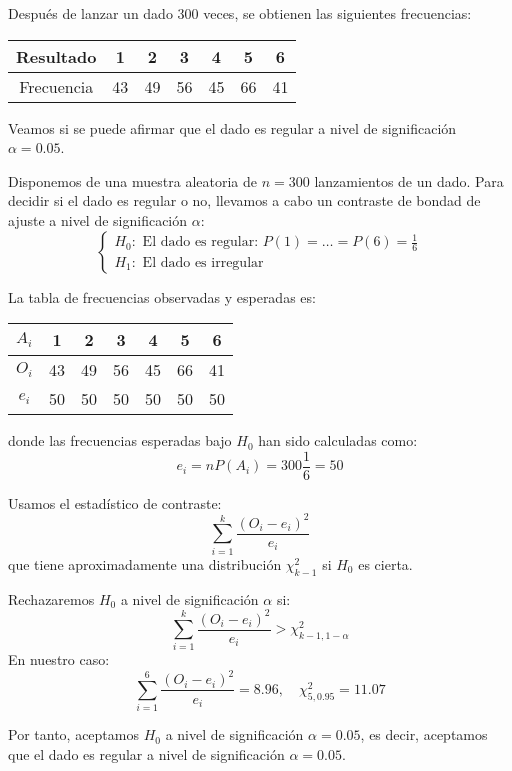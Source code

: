 \begin{example}
    Después de lanzar un dado 300 veces, se obtienen las siguientes frecuencias:
    \begin{center}
        \begin{tabular}{ | c | c c c c c c | }
            \hline
            Resultado  & 1  & 2  & 3  & 4  & 5  & 6  \\
            \hline
            Frecuencia & 43 & 49 & 56 & 45 & 66 & 41 \\
            \hline
        \end{tabular}
    \end{center}

    Veamos si se puede afirmar que el dado es regular a nivel de significación $\alpha = 0.05$.

    Disponemos de una muestra aleatoria de $n = 300$ lanzamientos de un dado.
    Para decidir si el dado es regular o no, llevamos a cabo un contraste de bondad de ajuste a nivel de significación $\alpha$:
    $$\begin{cases}
            H_0: \text{ El dado es regular: } P(1) = \dots = P(6) = \frac{1}{6} \\
            H_1: \text{ El dado es irregular}
        \end{cases}$$

    La tabla de frecuencias observadas y esperadas es:
    \begin{center}
        \begin{tabular}{| c | c c c c c c |}
            \hline
            $A_i$ & 1  & 2  & 3  & 4  & 5  & 6  \\
            \hline
            $O_i$ & 43 & 49 & 56 & 45 & 66 & 41 \\
            $e_i$ & 50 & 50 & 50 & 50 & 50 & 50 \\
            \hline
        \end{tabular}
    \end{center}
    donde las frecuencias esperadas bajo $H_0$ han sido calculadas como:
    $$e_i = nP(A_i) = 300 \frac{1}{6} = 50$$

    Usamos el estadístico de contraste:
    $$\sum_{i=1}^k \frac{(O_i-e_i)^2}{e_i}$$
    que tiene aproximadamente una distribución $\chi^2_{k-1}$ si $H_0$ es cierta.

    Rechazaremos $H_0$ a nivel de significación $\alpha$ si:
    $$\sum_{i=1}^k \frac{(O_i-e_i)^2}{e_i} > \chi^2_{k-1, 1-\alpha}$$
    En nuestro caso:
    $$\sum_{i=1}^6 \frac{(O_i-e_i)^2}{e_i} = 8.96, \quad \chi^2_{5, 0.95} = 11.07$$

    Por tanto, aceptamos $H_0$ a nivel de significación $\alpha = 0.05$, es decir, aceptamos que el dado es regular a nivel de significación $\alpha = 0.05$.
\end{example}


